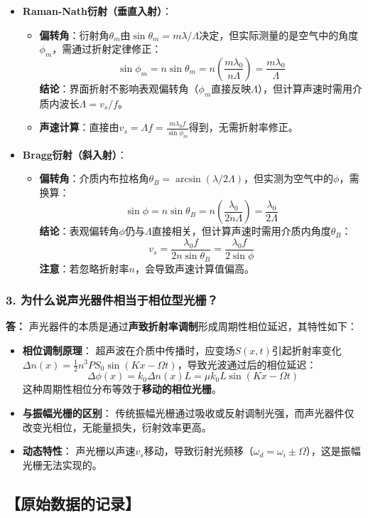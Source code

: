\documentclass[12pt,a4paper,UTF8]{ctexart}
\begin{document}
\begin{itemize}
    \item \textbf{Raman-Nath衍射（垂直入射）}：
    \begin{itemize}
        \item \textbf{偏转角}：衍射角$\theta_m$由$\sin \theta_m = m\lambda/\Lambda$决定，但实际测量的是空气中的角度$\phi_m$，需通过折射定律修正：
        \[
        \sin \phi_m = n \sin \theta_m = n \left( \frac{m\lambda_0}{n \Lambda} \right) = \frac{m\lambda_0}{\Lambda}
        \]
        \textbf{结论}：界面折射不影响表观偏转角（$\phi_m$直接反映$\Lambda$），但计算声速时需用介质内波长$\Lambda = v_s/f$。
        
        \item \textbf{声速计算}：直接由$v_s = \Lambda f = \frac{m\lambda_0 f}{\sin \phi_m}$得到，无需折射率修正。
    \end{itemize}
    
    \item \textbf{Bragg衍射（斜入射）}：
    \begin{itemize}
        \item \textbf{偏转角}：介质内布拉格角$\theta_B = \arcsin(\lambda/2\Lambda)$，但实测为空气中的$\phi$，需换算：
        \[
        \sin \phi = n \sin \theta_B = n \left( \frac{\lambda_0}{2n \Lambda} \right) = \frac{\lambda_0}{2\Lambda}
        \]
        \textbf{结论}：表观偏转角$\phi$仍与$\Lambda$直接相关，但计算声速时需用介质内角度$\theta_B$：
        \[
        v_s = \frac{\lambda_0 f}{2n \sin \theta_B} = \frac{\lambda_0 f}{2 \sin \phi}
        \]
        \textbf{注意}：若忽略折射率$n$，会导致声速计算值偏高。
    \end{itemize}
\end{itemize}

\subsubsection*{3. 为什么说声光器件相当于相位型光栅？}
\textbf{答：}
声光器件的本质是通过\textbf{声致折射率调制}形成周期性相位延迟，其特性如下\cite{huang200x}：

\begin{itemize}
    \item \textbf{相位调制原理}：
    超声波在介质中传播时，应变场$S(x,t)$引起折射率变化$\Delta n(x) = \frac{1}{2}n^3 P S_0 \sin(Kx-\Omega t)$，导致光波通过后的相位延迟：
    \[
    \Delta \phi(x) = k_0 \Delta n(x) L = \mu k_0 L \sin(Kx-\Omega t)
    \]
    这种周期性相位分布等效于\textbf{移动的相位光栅}。
    
    \item \textbf{与振幅光栅的区别}：
    传统振幅光栅通过吸收或反射调制光强，而声光器件仅改变光相位，无能量损失，衍射效率更高。
    
    \item \textbf{动态特性}：
    声光栅以声速$v_s$移动，导致衍射光频移（$\omega_d = \omega_i \pm \Omega$），这是振幅光栅无法实现的。
\end{itemize}



\subsection*{【原始数据的记录】}

\end{document}
